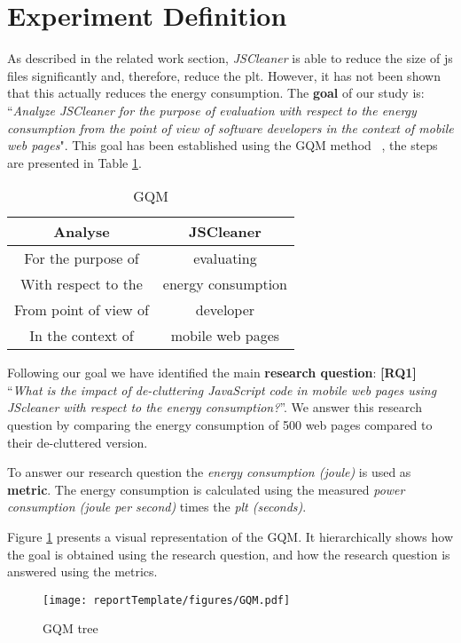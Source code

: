 \section{Experiment Definition}

As described in the related work section, \textit{JSCleaner} is able to reduce the size of \acrshort{js} files significantly and, therefore, reduce the \acrshort{plt}. However, it has not been shown that this actually reduces the energy consumption. The \textbf{goal} of our study is: ``\textit{Analyze JSCleaner for the purpose of evaluation with respect to the energy consumption from the point of view of software developers in the context of mobile web pages}". This goal has been established using the GQM method ~\cite{claes2012experimentation}, the steps are presented in Table \ref{tab:gqm}.

\begin{table}[H]
    \caption{GQM}
    \centering
    \begin{tabular}{||c || c||} 
     \hline
     Analyse & JSCleaner \\ 
     \hline
     For the purpose of & evaluating \\
     \hline
     With respect to the & energy consumption \\
     \hline
     From point of view of & developer \\
     \hline
     In the context of & mobile web pages \\
     \hline
    \end{tabular}
\label{tab:gqm}
\end{table}


Following our goal we have identified the main \textbf{research question}: \textbf{[RQ1]} ``\textit{What is the impact of de-cluttering JavaScript code in mobile web pages using \textit{JScleaner} with respect to the energy consumption?}''. We answer this research question by comparing the energy consumption of 500 web pages compared to their de-cluttered version. 

To answer our research question the \textit{energy consumption (joule)} is used as \textbf{metric}. The energy consumption is calculated using the measured \textit{power consumption (joule per second)} times the \textit{\acrshort{plt} (seconds)}.

Figure \ref{fig:gqm} presents a visual representation of the GQM. It hierarchically shows how the goal is obtained using the research question, and how the research question is answered using the metrics.

\begin{figure}[t]
\caption{GQM tree}
\texttt{[image: reportTemplate/figures/GQM.pdf]}
\centering
\label{fig:gqm}
\end{figure}

